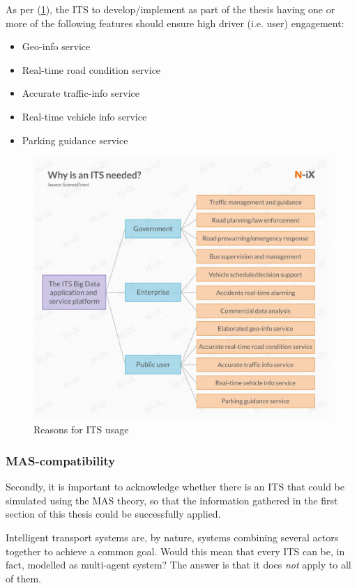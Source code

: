 \documentclass[main.tex]{subfiles}
\begin{document}
As per (\ref{whyITS}), the ITS to develop/implement as part of the thesis having one or more of 
the following features should ensure high driver (i.e. user) engagement:

\begin{itemize}
    \item Geo-info service
    \item Real-time road condition service 
    \item Accurate traffic-info service 
    \item Real-time vehicle info service 
    \item Parking guidance service
\end{itemize}

\begin{figure}[htbp]
    \centering
    \includegraphics[width=.8\textwidth]{why is ITS needed.jpg}
    \caption{Reasons for ITS usage}
    \label{whyITS}
\end{figure}

\subsubsection{MAS-compatibility} \label{mas-compatibility}

Secondly, it is important to acknowledge whether there is an ITS that could be simulated using the MAS theory,
so that the information gathered in the first section of this thesis could be successfully applied.

Intelligent transport systems are, by nature, systems combining several actors together to achieve a common goal. 
Would this mean that every ITS can be, in fact, modelled as multi-agent system? The answer is
that it does \emph{not} apply to all of them. 
\end{document}

